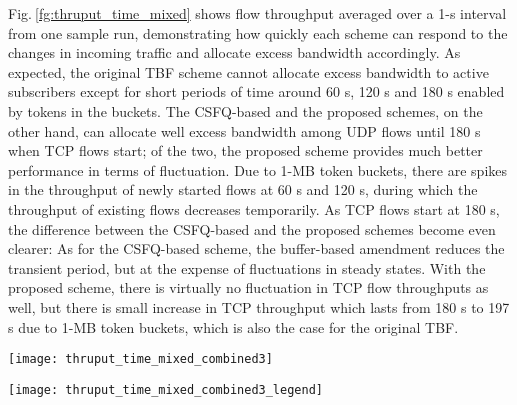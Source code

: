 \documentclass[conference,twoside,final]{IEEEtran}
\begin{document}
Fig.\(~\)\ref{fg:thruput_time_mixed} shows flow throughput averaged over a 1-s
interval from one sample run, demonstrating
how quickly each scheme can respond to the changes in incoming traffic and
allocate excess bandwidth accordingly. As expected, the original TBF scheme
cannot allocate excess bandwidth to active subscribers except for short periods
of time around 60 s, 120 s and 180 s enabled by tokens in the buckets. The
CSFQ-based and the proposed schemes, on the other hand, can allocate well excess
bandwidth among UDP flows until 180 s when TCP flows start; of the two, the
proposed scheme provides much better performance in terms of fluctuation. Due to
1-MB token buckets, there are spikes in the throughput of newly started flows at
60 s and 120 s, during which the throughput of existing flows decreases
temporarily. As TCP flows start at 180 s, the difference between the CSFQ-based
and the proposed schemes become even clearer: As for the CSFQ-based scheme, the
buffer-based amendment reduces the transient period, but at the expense of
fluctuations in steady states. With the proposed scheme, there is virtually no
fluctuation in TCP flow throughputs as well, but there is small increase in TCP
throughput which lasts from 180 s to 197 s due to 1-MB token buckets, which is
also the case for the original TBF.
\begin{figure*}[!htb]
    \hspace{0.04\linewidth}
    \begin{minipage}[c]{.85\linewidth}
        \begin{center}
            \texttt{[image: thruput\_time\_mixed\_combined3]}
        \end{center}
    \end{minipage}
    \begin{minipage}{.07\linewidth}
        \begin{center}
            \vspace{0.17\linewidth}
            \texttt{[image: thruput\_time\_mixed\_combined3\_legend]}
        \end{center}
    \end{minipage}
    \caption{Time series of throughput of flows for ISP traffic control schemes with mixed traffic.}
    \label{fg:thruput_time_mixed}
\end{figure*}
\end{document}
